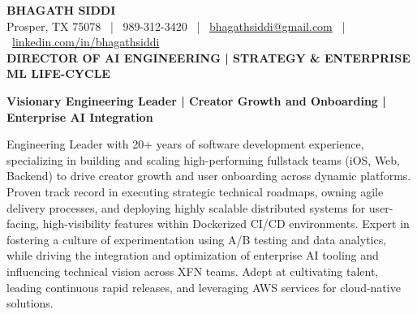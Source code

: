 \documentclass[9pt, letterpaper]{extarticle}
\begin{document}
\begin{center}
    {\huge \textbf{BHAGATH SIDDI}} \\
    \vspace{1pt}
    \small Prosper, TX 75078 \ | \ 989-312-3420 \ | \ \href{mailto:bhagathsiddi@gmail.com}{bhagathsiddi@gmail.com} \ | \ \href{https://www.linkedin.com/in/bhagathsiddi}{linkedin.com/in/bhagathsiddi} \\
    \vspace{2pt} 
    \textbf{\large DIRECTOR OF AI ENGINEERING | STRATEGY \& ENTERPRISE ML LIFE-CYCLE}
\end{center}

\vspace{-6pt}
{
\small \centering
\begin{center}\textbf{Visionary Engineering Leader | Creator Growth and Onboarding | Enterprise AI Integration}\end{center}\vspace{2mm}Engineering Leader with 20+ years of software development experience, specializing in building and scaling high-performing fullstack teams (iOS, Web, Backend) to drive creator growth and user onboarding across dynamic platforms. Proven track record in executing strategic technical roadmaps, owning agile delivery processes, and deploying highly scalable distributed systems for user-facing, high-visibility features within Dockerized CI/CD environments. Expert in fostering a culture of experimentation using A/B testing and data analytics, while driving the integration and optimization of enterprise AI tooling and influencing technical vision across XFN teams. Adept at cultivating talent, leading continuous rapid releases, and leveraging AWS services for cloud-native solutions.
\par}

\vspace{-6pt}

\end{document}
